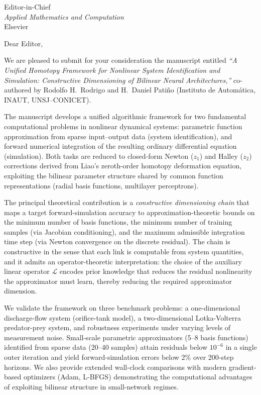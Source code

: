 \documentclass[11pt]{letter}
\begin{document}
\begin{letter}{Editor-in-Chief \\ \emph{Applied Mathematics and Computation} \\ Elsevier}

\opening{Dear Editor,}

We are pleased to submit for your consideration the manuscript entitled
\emph{``A Unified Homotopy Framework for Nonlinear System Identification
and Simulation: Constructive Dimensioning of Bilinear Neural
Architectures,''} co-authored by Rodolfo H.\ Rodrigo and H.\ Daniel
Pati\~no (Instituto de Autom\'atica, INAUT, UNSJ--CONICET).

The manuscript develops a unified algorithmic framework for two fundamental
computational problems in nonlinear dynamical systems: parametric function
approximation from sparse input--output data (system identification), and
forward numerical integration of the resulting ordinary differential
equation (simulation). Both tasks are reduced to closed-form Newton ($z_1$)
and Halley ($z_2$) corrections derived from Liao's zeroth-order homotopy
deformation equation, exploiting the bilinear parameter structure shared
by common function representations (radial basis functions, multilayer
perceptrons).

The principal theoretical contribution is a \emph{constructive dimensioning
chain} that maps a target forward-simulation accuracy to approximation-theoretic
bounds on the minimum number of basis functions, the minimum number of
training samples (via Jacobian conditioning), and the maximum admissible
integration time step (via Newton convergence on the discrete residual).
The chain is constructive in the sense that each link is computable from
system quantities, and it admits an operator-theoretic interpretation:
the choice of the auxiliary linear operator $\mathcal{L}$ encodes prior
knowledge that reduces the residual nonlinearity the approximator must
learn, thereby reducing the required approximator dimension.

We validate the framework on three benchmark problems: a one-dimensional
discharge-flow system (orifice-tank model), a two-dimensional Lotka-Volterra
predator-prey system, and robustness experiments under varying levels of
measurement noise. Small-scale parametric approximators (5--8 basis functions)
identified from sparse data (20--40 samples) attain residuals below $10^{-6}$
in a single outer iteration and yield forward-simulation errors below 2\%
over 200-step horizons. We also provide extended wall-clock comparisons
with modern gradient-based optimizers (Adam, L-BFGS) demonstrating the
computational advantages of exploiting bilinear structure in small-network
regimes.


\end{letter}
\end{document}
